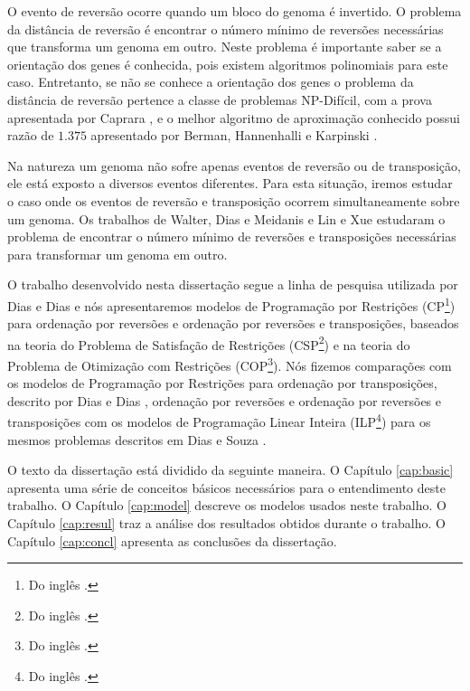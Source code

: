 
O evento de reversão ocorre quando um bloco do genoma é invertido. O
problema da distância de reversão é encontrar o número mínimo de
reversões necessárias que transforma um genoma em outro. Neste
problema é importante saber se a orientação dos genes é conhecida,
pois existem algoritmos polinomiais para este caso. Entretanto, se não
se conhece a orientação dos genes o problema da distância de reversão
pertence a classe de problemas NP-Difícil, com a prova apresentada por
Caprara \cite{Caprara*1997}, e o melhor algoritmo de aproximação
conhecido possui razão de $1.375$ apresentado por Berman,
Hannenhalli e Karpinski \cite{BermanHannenhalliKarpinski*2002}.

Na natureza um genoma não sofre apenas eventos de reversão ou de
transposição, ele está exposto a diversos eventos diferentes. Para
esta situação, iremos estudar o caso onde os eventos de reversão e
transposição ocorrem simultaneamente sobre um genoma. Os trabalhos de
Walter, Dias e
Meidanis \cite{MeidanisWalterDias*2002,WalterDiasMeidanis*1998} e Lin
e Xue \cite{LinXue*1999} estudaram o problema de encontrar o número
mínimo de reversões e transposições necessárias para transformar um
genoma em outro.

O trabalho desenvolvido nesta dissertação segue a linha de pesquisa
utilizada por Dias e Dias \cite{DiasDias*2009} e nós apresentaremos
modelos de Programação por Restrições (CP\footnote{Do
inglês .}) para ordenação por reversões e
ordenação por reversões e transposições, baseados na teoria do
Problema de Satisfação de Restrições (CSP\footnote{Do
inglês .}) e na teoria do
Problema de Otimização com Restrições (COP\footnote{Do
inglês .}). Nós fizemos
comparações com os modelos de Programação por Restrições para
ordenação por transposições, descrito por Dias e
Dias \cite{DiasDias*2009}, ordenação por reversões e ordenação por
reversões e transposições com os modelos de Programação Linear Inteira
(ILP\footnote{Do inglês .}) para os
mesmos problemas descritos em Dias e Souza \cite{DiasSouza*2007}.

O texto da dissertação está dividido da seguinte maneira. O
Capítulo \ref{cap:basic} apresenta uma série de conceitos básicos
necessários para o entendimento deste trabalho. O
Capítulo \ref{cap:model} descreve os modelos usados neste trabalho. O
Capítulo \ref{cap:resul} traz a análise dos resultados obtidos durante
o trabalho. O Capítulo \ref{cap:concl} apresenta as conclusões da
dissertação.
